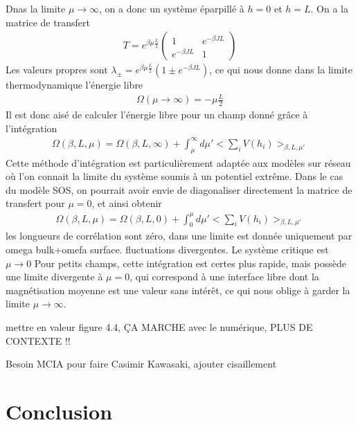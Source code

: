 Dnas la limite $\mu \rightarrow \infty$, on a donc un système éparpillé à $h=0$ et $h=L$. On a la matrice de transfert
\begin{align}
T= e^{\beta \mu \frac{L}{2}}
  \begin{pmatrix}
    1 & e^{-\beta  J L} \\
    e^{-\beta  J L} & 1
  \end{pmatrix}
\end{align}
Les valeurs propres sont $\lambda_\pm = e^{ \beta \mu \frac{L}{2}}( 1 \pm e^{-\beta J L})$, ce qui nous donne dans la limite thermodynamique l'énergie libre 
\begin{align}
  \Omega(\mu \rightarrow \infty) = - \mu \frac{L}{2}
\end{align}
Il est donc aisé de calculer l'énergie libre pour un champ donné grâce à l'intégration
\begin{align}
        \Omega(\beta,L,\mu) = \Omega(\beta,L,\infty) + \int_{\mu}^\infty d\mu'  < \sum_i V(h_i) >_{\beta,L,\mu'} 
\end{align}
Cette méthode d'intégration est particulièrement adaptée aux modèles sur réseau où l'on connait la limite du système soumis à un potentiel extrême. Dans le cas du modèle SOS, on pourrait avoir envie de diagonaliser directement la matrice de transfert pour $\mu=0$, et ainsi obtenir
\begin{align}
        \Omega(\beta,L,\mu) =\Omega(\beta,L,0) + \int_{0}^\mu d\mu'  < \sum_i V(h_i) >_{\beta,L,\mu'} 
\end{align}
{\color{red} les longueurs de corrélation sont zéro, dans une limite est donnée uniquement par omega bulk+omefa surface.  fluctuations divergentes. Le système critique est $\mu \to 0$}
Pour petits champs, cette intégration est certes plus rapide, mais possède une limite divergente à $\mu=0$, qui correspond à une interface libre dont la magnétisation moyenne est une valeur sans intérêt, ce qui nous oblige à garder la limite $\mu \to \infty$.

 {\color{red} mettre en valeur figure 4.4, ÇA MARCHE avec le numérique, PLUS DE CONTEXTE !!}

{\color{red} Besoin MCIA pour faire Casimir Kawasaki, ajouter cisaillement }

    \section{Conclusion}

